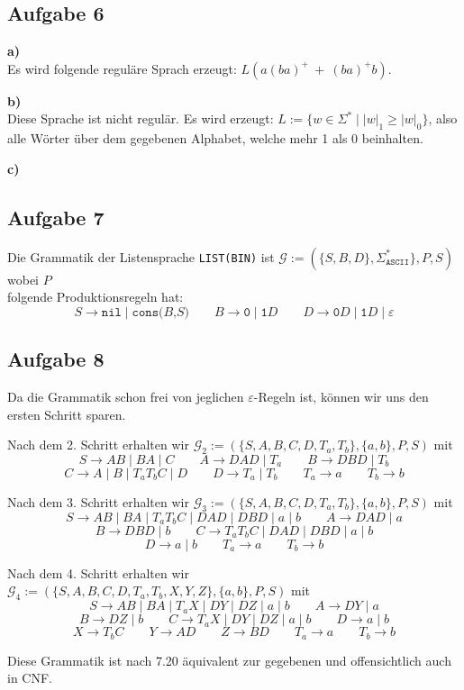 \documentclass[a4paper,graphics,11pt]{article}
\newcommand{\aufgabe}[1]{\subsection*{Aufgabe #1}}
\begin{document}
\aufgabe{6}
\textbf{a)}\\
Es wird folgende reguläre Sprach erzeugt: $L(a(ba)^+\ +\ (ba)^+ b)$.


\textbf{b)}\\
Diese Sprache ist nicht regulär. Es wird erzeugt: $L := \{w \in \Sigma^* \mid |w|_1 \geq |w|_0\}$, also
alle Wörter über dem gegebenen Alphabet, welche mehr 1 als 0 beinhalten.

\newpage

\textbf{c)}

\aufgabe{7}
Die Grammatik der Listensprache \texttt{LIST(BIN)} ist
$\mathcal{G} := (\{S, B, D\}, \Sigma^*_{\texttt{ASCII}}\}, P, S)$ wobei $P$\\
folgende Produktionsregeln hat:
$$
    S \to \texttt{nil} \mid \texttt{cons(}B\texttt{,}S\texttt{)}
    \qquad
    B \to \texttt{0} \mid \texttt{1}D
    \qquad
    D \to \texttt{0}D \mid \texttt{1}D \mid \varepsilon
$$

\aufgabe{8}
Da die Grammatik schon frei von jeglichen $\varepsilon$-Regeln ist, können wir uns den ersten Schritt sparen.

Nach dem 2. Schritt erhalten wir $\mathcal{G}_2 := (\{S, A, B, C, D, T_a, T_b\}, \{a,b\}, P, S)$ mit
$$
    S \to AB \mid BA \mid C
    \qquad
    A \to DAD \mid T_a
    \qquad
    B \to DBD \mid T_b
$$$$
    C \to A \mid B \mid T_aT_bC \mid D
    \qquad
    D \to T_a \mid T_b
    \qquad
    T_a \to a
    \qquad
    T_b \to b
$$

Nach dem 3. Schritt erhalten wir $\mathcal{G}_3 := (\{S, A, B, C, D, T_a, T_b\}, \{a,b\}, P, S)$ mit
$$
    S \to AB \mid BA \mid T_aT_bC \mid DAD \mid DBD \mid a \mid b
    \qquad
    A \to DAD \mid a
$$$$
    B \to DBD \mid b
    \qquad
    C \to T_aT_bC \mid DAD \mid DBD \mid a \mid b
$$$$
    D \to a \mid b
    \qquad
    T_a \to a
    \qquad
    T_b \to b
$$

Nach dem 4. Schritt erhalten wir $\mathcal{G}_4 := (\{S, A, B, C, D, T_a, T_b, X, Y, Z\}, \{a,b\}, P, S)$ mit
$$
    S \to AB \mid BA \mid T_aX \mid DY \mid DZ \mid a \mid b
    \qquad
    A \to DY \mid a
$$$$
    B \to DZ \mid b
    \qquad
    C \to T_aX \mid DY \mid DZ \mid a \mid b
    \qquad
    D \to a \mid b
$$$$
    X \to T_bC
    \qquad
    Y \to AD
    \qquad
    Z \to BD
    \qquad
    T_a \to a
    \qquad
    T_b \to b
$$

Diese Grammatik ist nach 7.20 äquivalent zur gegebenen und offensichtlich auch in CNF.
\end{document}
